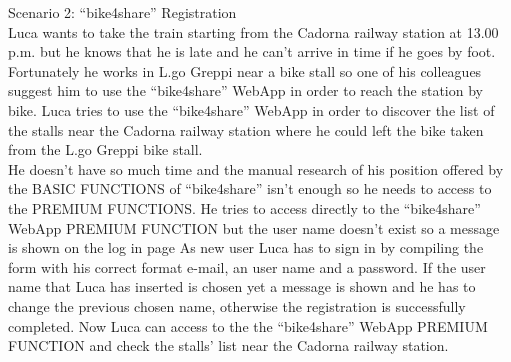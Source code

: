 \documentclass{article}
\begin{document}
Scenario 2: “bike4share” Registration \\
Luca wants to take the train starting from the Cadorna railway station at 13.00 p.m. but he knows that he is late and he can’t arrive in time if he goes by foot.\\ Fortunately he works in L.go Greppi near a bike stall so one of his colleagues suggest him to use the “bike4share” WebApp in order to reach the station by bike. Luca tries to use the “bike4share” WebApp in order to discover the list of the stalls near the Cadorna railway station where he could left the bike taken from the L.go Greppi bike stall.\\ 
He doesn’t have so much time and the manual research of his position offered by the BASIC FUNCTIONS of “bike4share” isn’t enough so he needs to access to the PREMIUM FUNCTIONS.
He tries to access directly to the “bike4share” WebApp PREMIUM FUNCTION but the user name doesn’t exist so a message is shown on the log in page 
As new user Luca has to sign in by compiling the form with his correct format e-mail, an user name and a password. 
If the user name that Luca has inserted is chosen yet a message is shown and he has to change the previous chosen name, otherwise the registration is successfully completed.
Now Luca can access to the the “bike4share” WebApp PREMIUM FUNCTION and check the stalls’ list near the Cadorna railway station.
\end{document}
